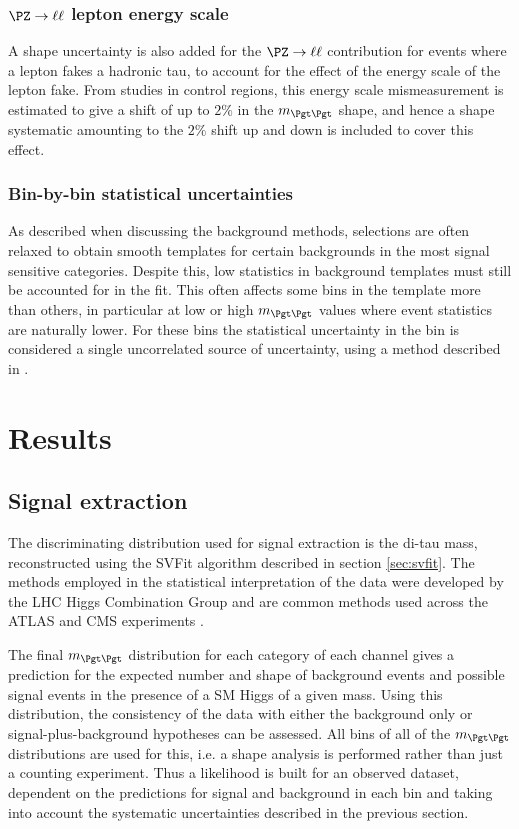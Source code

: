 \subsubsection{\textbf{$\PZ \to \ell\ell$ lepton energy scale}}
A shape uncertainty is also added for the $\PZ \to \ell\ell$ contribution for 
events where a lepton fakes a hadronic tau, to account for the effect of the energy 
scale of the lepton fake. From studies in control regions, this energy scale mismeasurement is 
estimated to give a shift of up to $2\%$ in the $m_{\Pgt\Pgt}$ shape, and hence a shape systematic amounting to the
$2\%$ shift up and down is included to cover this effect. %

\subsubsection{\textbf{Bin-by-bin statistical uncertainties}}
As described when discussing the background methods, selections are often
relaxed to obtain smooth templates for certain backgrounds in the most signal
sensitive categories. Despite this, low statistics in background templates must
still be accounted for in the fit. This often affects some bins in the
template more than others, in particular at low or high $m_{\Pgt\Pgt}$ values
where event statistics are naturally lower. For these bins the statistical
uncertainty in the bin is considered a single uncorrelated source of
uncertainty, using a method described in \cite{Barlow1993219}. 



\section{Results}
\label{sec:results}

\subsection{Signal extraction}
\label{sec:signalextraction}

The discriminating distribution used for signal extraction is the di-tau mass,
reconstructed using the SVFit algorithm described in section \ref{sec:svfit}. 
The methods employed in the statistical
interpretation of the data were developed by the LHC Higgs Combination Group and
are common methods used across the ATLAS and CMS experiments \cite{LHC-HCG-Report}.

The final $m_{\Pgt\Pgt}$ distribution for each category of each channel gives
a prediction for the expected number and shape of background events and 
possible signal events in the presence of a \ac{SM} Higgs of a given mass. 
Using this distribution, the consistency of the data with either the background only or
signal-plus-background hypotheses can be assessed. All bins of all of the $m_{\Pgt\Pgt}$
distributions are used for this, i.e. a shape analysis is performed rather than just a
counting experiment. Thus a likelihood is built for an observed dataset,
dependent on the predictions for signal and background in each bin and taking into account
the systematic uncertainties described in the previous section.

